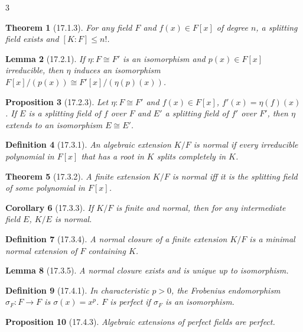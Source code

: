 \documentclass[10pt,landscape]{article}
\newtheorem{theorem}{Theorem}[section]
\newtheorem{definition}[theorem]{Definition}
\newtheorem{lemma}[theorem]{Lemma}
\newtheorem{proposition}[theorem]{Proposition}
\newtheorem{corollary}[theorem]{Corollary}
\begin{document}
\begin{multicols}{3}
\begin{theorem}[17.1.3]
For any field $F$ and $f(x)\in F[x]$ of degree $n$, a splitting field exists and $[K:F]\le n!$.
\end{theorem}

\begin{lemma}[17.2.1]
If $\eta:F\cong F'$ is an isomorphism and $p(x)\in F[x]$ irreducible, then $\eta$ induces an isomorphism $F[x]/(p(x)) \cong F'[x]/(\eta(p)(x))$.
\end{lemma}

\begin{proposition}[17.2.3]
Let $\eta:F\cong F'$ and $f(x)\in F[x]$, $f'(x)=\eta(f)(x)$. If $E$ is a splitting field of $f$ over $F$ and $E'$ a splitting field of $f'$ over $F'$, then $\eta$ extends to an isomorphism $E\cong E'$.
\end{proposition}

\begin{definition}[17.3.1]
An algebraic extension $K/F$ is normal if every irreducible polynomial in $F[x]$ that has a root in $K$ splits completely in $K$.
\end{definition}

\begin{theorem}[17.3.2]
A finite extension $K/F$ is normal iff it is the splitting field of some polynomial in $F[x]$.
\end{theorem}

\begin{corollary}[17.3.3]
If $K/F$ is finite and normal, then for any intermediate field $E$, $K/E$ is normal.
\end{corollary}

\begin{definition}[17.3.4]
A normal closure of a finite extension $K/F$ is a minimal normal extension of $F$ containing $K$.
\end{definition}

\begin{lemma}[17.3.5]
A normal closure exists and is unique up to isomorphism.
\end{lemma}

\begin{definition}[17.4.1]
In characteristic $p>0$, the Frobenius endomorphism $\sigma_F:F\to F$ is $\sigma(x)=x^p$. $F$ is perfect if $\sigma_F$ is an isomorphism.
\end{definition}

\begin{proposition}[17.4.3]
Algebraic extensions of perfect fields are perfect.
\end{proposition}


\end{multicols}
\end{document}
